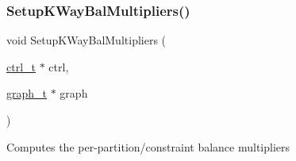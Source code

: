 \subsubsection{\texorpdfstring{Setup\+K\+Way\+Bal\+Multipliers()}{SetupKWayBalMultipliers()}}
{\footnotesize\ttfamily void Setup\+K\+Way\+Bal\+Multipliers (\begin{DoxyParamCaption}\item[{\hyperlink{a00742}{ctrl\+\_\+t} $\ast$}]{ctrl,  }\item[{\hyperlink{a00734}{graph\+\_\+t} $\ast$}]{graph }\end{DoxyParamCaption})}

Computes the per-\/partition/constraint balance multipliers 